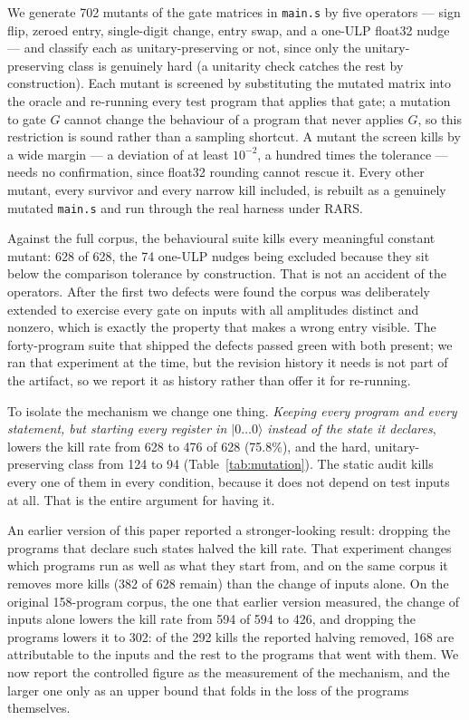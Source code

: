 \documentclass[11pt]{article}
\newcommand{\ket}[1]{\ensuremath{|#1\rangle}}
\begin{document}
We generate 702 mutants of the gate matrices in \texttt{main.s} by five operators ---
sign flip, zeroed entry, single-digit change, entry swap, and a one-ULP float32 nudge --- and
classify each as unitary-preserving or not, since only the unitary-preserving class is
genuinely hard (a unitarity check catches the rest by construction). Each mutant is
screened by substituting the mutated matrix into the oracle and re-running every test
program that applies that gate; a mutation to gate $G$ cannot change the behaviour of a
program that never applies $G$, so this restriction is sound rather than a sampling
shortcut. A mutant the screen kills by a wide margin --- a deviation of at least
$10^{-2}$, a hundred times the tolerance --- needs no confirmation, since float32 rounding
cannot rescue it. Every other mutant, every survivor and every narrow kill included, is
rebuilt as a genuinely mutated \texttt{main.s} and run through the real harness under RARS.

Against the full corpus, the behavioural suite kills every meaningful constant mutant:
628 of 628, the 74 one-ULP nudges being excluded because they sit
below the comparison tolerance by construction. That is not an accident of the operators.
After the first two defects were found the corpus was deliberately extended to exercise
every gate on inputs with all amplitudes distinct and nonzero, which is exactly the
property that makes a wrong entry visible. The forty-program suite that shipped the defects
passed green with both present; we ran that experiment at the time, but the revision
history it needs is not part of the artifact, so we report it as history rather than offer
it for re-running.

To isolate the mechanism we change one thing. \emph{Keeping every program and every
statement, but starting every register in \ket{0\ldots0} instead of the state it
declares}, lowers the kill rate from 628 to 476 of 628
(75.8\%), and the hard, unitary-preserving class from 124 to 94
(Table~\ref{tab:mutation}). The static audit kills every one of them in every condition,
because it does not depend on test inputs at all. That is the entire argument for having
it.

An earlier version of this paper reported a stronger-looking result: dropping the programs
that declare such states halved the kill rate. That experiment changes which programs run
as well as what they start from, and on the same corpus it removes more kills
(382 of 628 remain) than the change of inputs alone. On the original 158-program corpus, the one that earlier version measured, the change of inputs alone lowers the kill rate from 594 of 594 to 426, and dropping the programs lowers it to 302: of the 292 kills the reported halving removed, 168 are attributable to the inputs and the rest to the programs that went with them. We now
report the controlled figure as the measurement of the mechanism, and the larger one only
as an upper bound that folds in the loss of the programs themselves.
\end{document}
